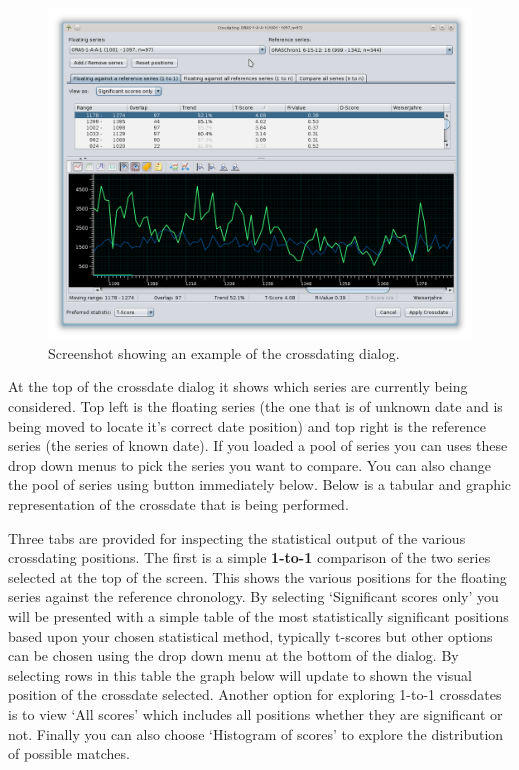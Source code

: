 \begin{figure}[hbtp]
  \label{fig:crossdate}
  \centering
  \includegraphics[width=\textwidth]{Images/crossdate1.png}
  \caption{Screenshot showing an example of the crossdating dialog.}
\end{figure}

At the top of the crossdate dialog it shows which series are currently being considered.  Top left is the floating series (the one that is of unknown date and is being moved to locate it's correct date position) and top right is the reference series (the series of known date).  If you loaded a pool of series you can uses these drop down menus to pick the series you want to compare.  You can also change the pool of series using button immediately below.  Below is a tabular and graphic representation of the crossdate that is being performed.  

Three tabs are provided for inspecting the statistical output of the various crossdating positions.  The first is a simple \textbf{1-to-1} comparison of the two series selected at the top of the screen.  This shows the various positions for the floating series against the reference chronology.   By selecting `Significant scores only' you will be presented with a simple table of the most statistically significant positions based upon your chosen statistical method, typically t-scores but other options can be chosen using the drop down menu at the bottom of the dialog.  By selecting rows in this table the graph below will update to shown the visual position of the crossdate selected.  Another option for exploring 1-to-1 crossdates is to view `All scores' which includes all positions whether they are significant or not.  Finally you can also choose `Histogram of scores' to explore the distribution of possible matches.

